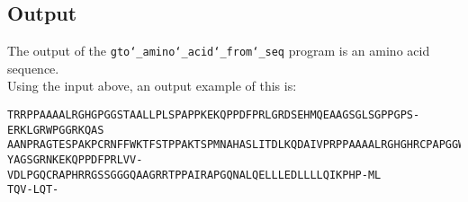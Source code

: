 \subsection*{Output}

The output of the \texttt{gto\char`_amino\char`_acid\char`_from\char`_seq} program is an amino acid sequence.\\

Using the input above, an output example of this is:

\begin{lstlisting}
TRRPPAAAALRGHGPGGSTAALLPLSPAPPKEKQPPDFPRLGRDSEHMQEAAGSGLSGPPGPS-ERKLGRWPGGRKQAS
AANPRAGTESPAKPCRNFFWKTFSTPPAKTSPMNAHASLITDLKQDAIVPRPPAAAALRGHGHRCPAPGGWPHRPRQRA
YAGSGRNKEKQPPDFPRLVV-VDLPGQCRAPHRRGSSGGGQAAGRRTPPAIRAPGQNALQELLLEDLLLLQIKPHP-ML
TQV-LQT-
\end{lstlisting}
